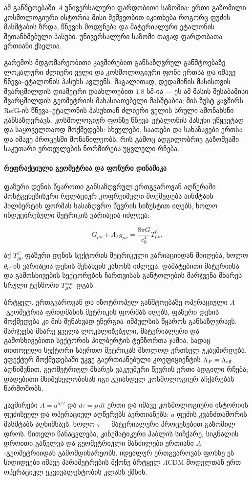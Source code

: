 \documentclass[11pt,a4paper]{article}
\begin{document}
ამ განშტოებაში $A$ უნივერსალური ფარდობითი საზომია: ერთი გაზომილი კოსმოლოგიური ისტორია მისი მეშვეობით იკითხება როგორც ფუძის მასშტაბის ზრდა, წნევის მოდუნება და მატერიალური ეტალონის შეთანხმებული პასუხი. უნივერსალური საზომი თავად ფარდობათა ერთიანი ქსელია.

გარემოს მდგომარეობითი კავშირებით განსაზღვრულ განშტოებაზე ლოკალური ძლიერი ველი და კოსმოლოგიური ფონი ერთსა და იმავე წნევა–ეტალონის პასუხს ავლენს. მაგალითად, დედამიწის მასისთვის შვარცშილდის დიამეტრი დაახლოებით $1.8$ სმ-ია — ეს ამ მასის შესაბამისი შვარცშილდის გეომეტრიის მახასიათებელი მასშტაბია; მის ზუსტ კავშირს RefG-ის წნევა–ეტალონის პასუხთან ძლიერი ველის სრული ამონახსნი განსაზღვრავს. კოსმოლოგიურ ფონზე წნევა–ეტალონის პასუხი უწყვეტად და საყოველთაოდ მოქმედებს: სხეულები, საათები და სახაზავები ერთსა და იმავე პროცესში მონაწილეობს, რის გამოც ადგილობრივ გაზომვაში საკუთარი ერთეულების ნორმირება უცვლელი რჩება.

\paragraph{რეფრაქციული გეომეტრია და ფონური დინამიკა}

ფაზური დენის წყაროთი განსაზღვრულ ერთგვაროვან აღწერაში პოსტგენეზისური რელაციურ-კოფრეიმული მოქმედება აინშტაინ–ჰილბერტის ფორმას სასაზღვრო წევრის სიზუსტით იღებს, ხოლო ინდუცირებული მეტრიკის ვარიაცია იძლევა:

\[
G_{\mu\nu}+\Lambda_Fg_{\mu\nu}
=\frac{8\pi G}{c_0^4}T^C_{\mu\nu}.
\]

აქ $T^C_{\mu\nu}$ ფაზური დენის სექტორის მეტრიკული ვარიაციიდან მიიღება, ხოლო $\theta_C$-ის ვარიაცია დენის შენახვის კანონს იძლევა. დამატებითი მატერიისა და გამოსხივების სექტორების ჩართვისას განტოლების მარჯვენა მხარეს სრული ტენზორი $T^{\rm tot}_{\mu\nu}$ დგას.

ბრტყელ, ერთგვაროვან და იზოტროპულ განშტოებაზე ოპერაციული $A$-გეომეტრია ფრიდმანის მეტრიკის ფორმას იღებს, ფაზური დენის მოქმედება კი მის შენახვად ენერგია–იმპულსის წყაროს განსაზღვრავს. მარჯვენა მხარე ყველა ლოკალიზებული, მატერიალური და გამოსხივებითი სექტორის ჰილბერტის ტენზორთა ჯამია, სადაც თითოეული სექტორი საერთო მეტრიკას მხოლოდ ერთხელ უკავშირდება. ეფექტურ მოქმედებაში უკვე გაერთიანებული კოეფიციენტის $\Lambda_F\equiv\Lambda_{\rm eff}$ აღნიშვნით, გეომეტრიულ მხარეს ვაკუუმური წევრის ერთი ადგილი რჩება; დადებითი მნიშვნელობისას იგი გვიანდელ კოსმოლოგიურ აჩქარებას წარმოშობს.

კავშირები $A=a^{5/2}$ და $d\tau=p\,dt$ ერთი და იმავე კოსმოლოგიური ისტორიის ფუძისეულ და ოპერაციულ აღწერებს აერთიანებს: $a$ ფუძის კვანძთაშორის მასშტაბს აღნიშნავს, ხოლო $\tau$ — მატერიალური პროცესებით გაზომილ დროს. წითელი წანაცვლება, კინემატიკური ჰაბლის სიჩქარე, სიგნალის დროითი გაწელვა და გეომეტრიული მანძილები ერთიანი $A$-გეომეტრიიდან გამომდინარეობს. იდეალურ ერთგვაროვან ფონზე ეს სიდიდეები იმავე პარამეტრების მქონე ბრტყელ $\Lambda$CDM მოდელთან ერთ ოპერაციულ ეკვივალენტობის კლასს ქმნის.
\end{document}

